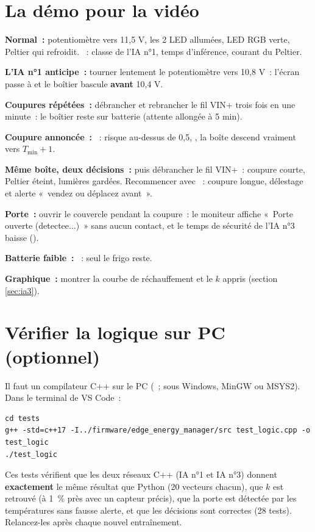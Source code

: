 \section{La démo pour la vidéo}\label{sec:demo}
\begin{steps}
  \item \textbf{Normal~:} potentiomètre vers 11,5 V, les 2 LED allumées, LED RGB verte, Peltier qui refroidit. ~: classe de l'IA n°1, temps d'inférence, courant du Peltier.
  \item \textbf{L'IA n°1 anticipe~:} tourner lentement le potentiomètre vers 10,8 V~: l'écran passe à  et le boîtier bascule \textbf{avant} 10,4 V.
  \item \textbf{Coupures répétées~:} débrancher et rebrancher le fil VIN+ trois fois en une minute~: le boîtier reste sur batterie (attente allongée à 5 min).
  \item \textbf{Coupure annoncée~:} ~: risque au-dessus de 0,5, , la boîte descend vraiment vers $T_{\min} + 1$.
  \item \textbf{Même boîte, deux décisions~:}  puis débrancher le fil VIN+~: coupure courte, Peltier éteint, lumières gardées. Recommencer avec ~: coupure longue, délestage et alerte «~vendez ou déplacez avant~».
  \item \textbf{Porte~:} ouvrir le couvercle pendant la coupure~: le moniteur affiche «~Porte ouverte (detectee...)~» sans aucun contact, et le temps de sécurité de l'IA n°3 baisse ().
  \item \textbf{Batterie faible~:} ~: seul le frigo reste.
  \item \textbf{Graphique~:} montrer la courbe de réchauffement et le $k$ appris (section \ref{sec:ia3}).
\end{steps}

\section{Vérifier la logique sur PC (optionnel)}\label{sec:tests}
Il faut un compilateur C++ sur le PC (~; sous Windows, MinGW ou MSYS2). Dans le terminal de VS Code~:
\begin{lstlisting}[style=cmd]
cd tests
g++ -std=c++17 -I../firmware/edge_energy_manager/src test_logic.cpp -o test_logic
./test_logic
\end{lstlisting}
Ces tests vérifient que les deux réseaux C++ (IA n°1 et IA n°3) donnent \textbf{exactement} le même résultat que Python (20 vecteurs chacun), que $k$ est retrouvé (à 1~\% près avec un capteur précis), que la porte est détectée par les températures sans fausse alerte, et que les décisions sont correctes (28 tests). Relancez-les après chaque nouvel entraînement.


